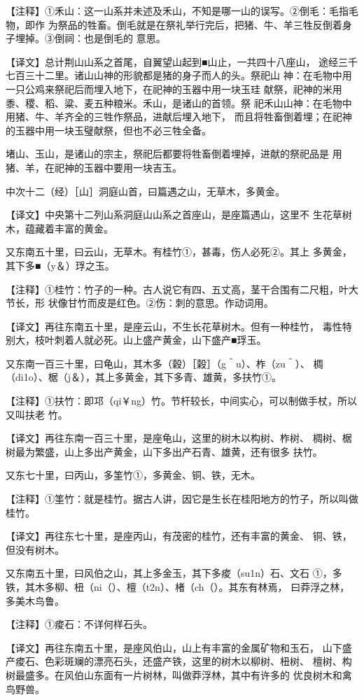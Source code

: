 \documentclass[a4paper,12pt,UTF8,twoside]{ctexbook}
\begin{document}
【注释】①禾山：这一山系并未述及禾山，不知是哪一山的误写。②倒毛：毛指毛物，即作 为祭品的牲畜。倒毛就是在祭礼举行完后，把猪、牛、羊三牲反倒着身子埋掉。③倒祠：也是倒毛的 意思。

【译文】总计荆山山系之首尾，自翼望山起到■山止，一共四十八座山， 途经三千七百三十二里。诸山山神的形貌都是猪的身子而人的头。祭祀山 神：在毛物中用一只公鸡来祭祀后而埋入地下，在祀神的玉器中用一块玉珪 献祭，祀神的米用黍、稷、稻、粱、麦五种粮米。禾山，是诸山的首领。祭 祀禾山山神：在毛物中用猪、牛、羊齐全的三牲作祭品，进献后埋入地下， 而且将牲畜倒着埋；在祀神的玉器中用一块玉璧献祭，但也不必三牲全备。

堵山、玉山，是诸山的宗主，祭祀后都要将牲畜倒着埋掉，进献的祭祀品是 用猪、羊，在祀神的玉器中要用一块吉玉。

中次十二（经）［山］洞庭山首，曰篇遇之山，无草木，多黄金。

【译文】中央第十二列山系洞庭山山系之首座山，是座篇遇山，这里不 生花草树木，蕴藏着丰富的黄金。

又东南五十里，曰云山，无草木。有桂竹①，甚毒，伤人必死②。其上 多黄金，其下多■（y＆）琈之玉。

【注释】①桂竹：竹子的一种。古人说它有四、五丈高，茎干合围有二尺粗，叶大节长，形 状像甘竹而皮是红色。②伤：刺的意思。作动词用。

【译文】再往东南五十里，是座云山，不生长花草树木。但有一种桂竹， 毒性特别大，枝叶刺着人就必死。山上盛产黄金，山下盛产■琈玉。

又东南一百三十里，曰龟山，其木多（穀）［榖］（g＾u）、柞（zu＾）、 椆（di1o）、椐（j＆），其上多黄金，其下多青、雄黄，多扶竹①。

【注释】①扶竹：即邛（qi￥ng）竹。节杆较长，中间实心，可以制做手杖，所以又叫扶老 竹。

【译文】再往东南一百三十里，是座龟山，这里的树木以构树、柞树、 椆树、椐树最为繁盛，山上多出产黄金，山下多出产石青、雄黄，还有很多 扶竹。

又东七十里，曰丙山，多筀竹①，多黄金、铜、铁，无木。

【注释】①筀竹：就是桂竹。据古人讲，因它是生长在桂阳地方的竹子，所以叫做桂竹。

【译文】再往东七十里，是座丙山，有茂密的桂竹，还有丰富的黄金、 铜、铁，但没有树木。

又东南五十里，曰风伯之山，其上多金玉，其下多痠（su1n）石、文石 ①，多铁，其木多柳、杻（ni（）、檀（t2n）、楮（ch（）。其东有林焉， 曰莽浮之林，多美木鸟鲁。

【注释】①痠石：不详何样石头。

【译文】再往东南五十里，是座风伯山，山上有丰富的金属矿物和玉石， 山下盛产痠石、色彩斑斓的漂亮石头，还盛产铁，这里的树木以柳树、杻树、 檀树、构树最盛多。在风伯山东面有一片树林，叫做莽浮林，其中有许多的 优良树木和禽鸟野兽。
\end{document}
